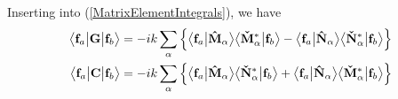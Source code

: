 \documentclass[dvips,letterpaper]{article}
\begin{document}
Inserting into (\ref{MatrixElementIntegrals}), we have 
\begin{align*}
 \big\langle \mathbf{f}_a \big| \mathbf{G} \big| \mathbf{f}_b \big\rangle
&=-ik\sum_{\alpha} 
    \Big\{  \big\langle \mathbf{f}_a \big| \mathbf{\hat M}_\alpha \big\rangle
            \big\langle \mathbf{\mathbf{\check M}}^*_\alpha \big| \mathbf{f}_b \big\rangle
           -\big\langle \mathbf{f}_a \big| \mathbf{\hat N}_\alpha \big\rangle
            \big\langle \mathbf{\mathbf{\check N}}^*_\alpha \big| \mathbf{f}_b \big\rangle
    \Big\}\\
 \big\langle \mathbf{f}_a \big| \mathbf{C} \big| \mathbf{f}_b \big\rangle
&=-ik\sum_{\alpha} 
    \Big\{  \big\langle \mathbf{f}_a \big| \mathbf{\hat M}_\alpha \big\rangle
            \big\langle \mathbf{\mathbf{\check N}}^*_\alpha \big| \mathbf{f}_b \big\rangle
           +\big\langle \mathbf{f}_a \big| \mathbf{\hat N}_\alpha \big\rangle
            \big\langle \mathbf{\mathbf{\check M}}^*_\alpha \big| \mathbf{f}_b \big\rangle
    \Big\}
\end{align*}
\end{document}
